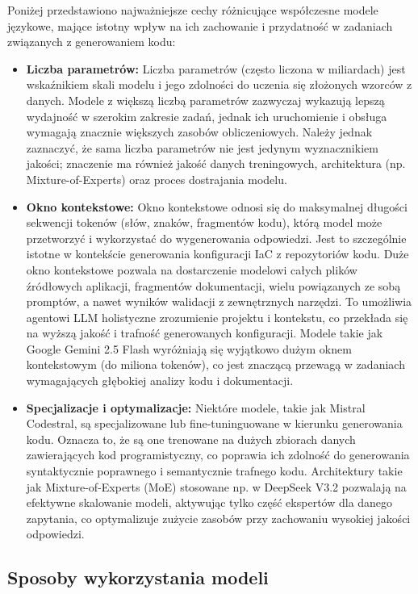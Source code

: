Poniżej przedstawiono najważniejsze cechy różnicujące współczesne modele językowe, mające istotny wpływ na ich zachowanie i przydatność w zadaniach związanych z generowaniem kodu:

\begin{itemize}
    \item \textbf{Liczba parametrów:} Liczba parametrów (często liczona w miliardach) jest wskaźnikiem skali modelu i jego zdolności do uczenia się złożonych wzorców z danych. Modele z większą liczbą parametrów zazwyczaj wykazują lepszą wydajność w szerokim zakresie zadań, jednak ich uruchomienie i obsługa wymagają znacznie większych zasobów obliczeniowych. Należy jednak zaznaczyć, że sama liczba parametrów nie jest jedynym wyznacznikiem jakości; znaczenie ma również jakość danych treningowych, architektura (np. Mixture-of-Experts) oraz proces dostrajania modelu.
    \item \textbf{Okno kontekstowe:} Okno kontekstowe odnosi się do maksymalnej długości sekwencji tokenów (słów, znaków, fragmentów kodu), którą model może przetworzyć i wykorzystać do wygenerowania odpowiedzi. Jest to szczególnie istotne w kontekście generowania konfiguracji IaC z repozytoriów kodu. Duże okno kontekstowe pozwala na dostarczenie modelowi całych plików źródłowych aplikacji, fragmentów dokumentacji, wielu powiązanych ze sobą promptów, a nawet wyników walidacji z zewnętrznych narzędzi. To umożliwia agentowi LLM holistyczne zrozumienie projektu i kontekstu, co przekłada się na wyższą jakość i trafność generowanych konfiguracji. Modele takie jak Google Gemini 2.5 Flash wyróżniają się wyjątkowo dużym oknem kontekstowym (do miliona tokenów), co jest znaczącą przewagą w zadaniach wymagających głębokiej analizy kodu i dokumentacji.
    \item \textbf{Specjalizacje i optymalizacje:} Niektóre modele, takie jak Mistral Codestral, są specjalizowane lub fine-tuninguowane w kierunku generowania kodu. Oznacza to, że są one trenowane na dużych zbiorach danych zawierających kod programistyczny, co poprawia ich zdolność do generowania syntaktycznie poprawnego i semantycznie trafnego kodu. Architektury takie jak Mixture-of-Experts (MoE) stosowane np. w DeepSeek V3.2 pozwalają na efektywne skalowanie modeli, aktywując tylko część ekspertów dla danego zapytania, co optymalizuje zużycie zasobów przy zachowaniu wysokiej jakości odpowiedzi.
\end{itemize}

\subsection{Sposoby wykorzystania modeli}

